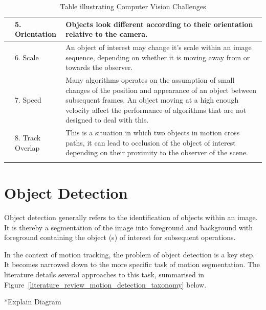 \begin{longtable}{c  p{3cm}  p{4cm}}
    &
    5. Orientation
    &
    Objects look different according to their orientation relative
    to the camera.
    \\ \bottomrule

    &
    6. Scale
    &
    An object of interest may change it's scale within an image
    sequence, depending on whether it is moving away from or towards
    the observer.
    \\ \bottomrule

    &
    7. Speed 
    &
    Many algorithms operates on the assumption of small
    changes of the position and appearance of an object between
    subsequent frames. An object moving at a high enough velocity
    affect the performance of algorithms that are not designed to
    deal with this.
    \\ \bottomrule
    &
    8. Track Overlap
    &
    This is a situation in which two objects in motion cross paths, it can lead
    to occlusion of the object of interest depending on their proximity to the
    observer of the scene.
    \\ \bottomrule

    \caption{Table illustrating Computer Vision Challenges}
\end{longtable}\label{tbl:computer_vision_challenges}

\section{Object Detection}
Object detection generally refers to the identification of objects within
an image. It is thereby a segmentation of the image into foreground
and background with foreground containing the object (s) of interest for subsequent
operations.

In the context of motion tracking, the problem of object detection is a key
step. It becomes narrowed down to the more specific task of motion segmentation.
The literature details several approaches to this task, summarised in 
Figure~\ref{literature_review_motion_detection_taxonomy} below.


*Explain Diagram

